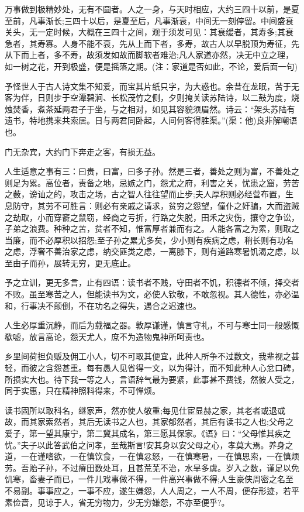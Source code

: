 \documentclass[letterpaper,10pt,english]{sphinxmanual}
\begin{document}
万事做到极精妙处，无有不圆者。人之一身，与天时相应，大约三四十以前，是夏至前，凡事渐长;三四十以后，是夏至后，凡事渐衰，中间无一刻停留。中间盛衰关头，无一定时候，大概在三四十之间，观于须发可见：其衰缓者，其寿多;其衰急者，其寿寡。人身不能不衰，先从上而下者，多寿，故古人以早脱顶为寿征，先从下而上者，多不寿，故须发如故而脚软者难治;凡人家道亦然，决无中立之理，如一树之花，开到极盛，便是摇落之期。(注：家道是否如此，不论，爱后面一句)

予怪世人于古人诗文集不知爱，而宝其片纸只字，为大惑也。余昔在龙眠，苦于无客为伴，日则步于空潭碧涧、长松茂竹之侧，夕则掩关读苏陆诗，以二鼓为度，烧烛焚香，煮茶延两君子于坐，与之相对，如见其容貌须眉然。诗云：“架头苏陆有遗书，特地携来共索居。日与两君同卧起，人间何客得胜渠。”(渠：他)良非解嘲语也。

门无杂宾，大约门下奔走之客，有损无益。

人生适意之事有三：曰贵，曰富，曰多子孙。然是三者，善处之则为富，不善处之则足为累。高位者，责备之地，忌嫉之门，怨尤之府，利害之关，忧患之窟，劳苦之薮，谤讪之的，攻击之场，古之智人往往望而止步;夫人厚积则必经营布置，生息防守，其劳不可胜言：则必有亲戚之请求，贫穷之怨望，僮仆之奸骗，大而盗贼之劫取，小而穿窬之鼠窃，经商之亏折，行路之失脱，田禾之灾伤，攘夺之争讼，子弟之浪费。种种之苦，贫者不知，惟富厚者兼而有之。人能各富之为累，则取之当廉，而不必厚积以招怨;至子孙之累尤多矣，少小则有疾病之虑，稍长则有功名之虑，浮奢不善治家之虑，纳交匪类之虑，一离膝下，则有道路寒暑饥渴之虑，以至由子而孙，展转无穷，更无底止。

予之立训，更无多言，止有四语：读书者不贱，守田者不饥，积德者不倾，择交者不败。虽至寒苦之人，但能读书为文，必使人钦敬，不敢忽视。其人德性，亦必温和，行事决不颠倒，不在功名之得失，遇合之迟速也。

人生必厚重沉静，而后为载福之器。敦厚谦谨，慎言守礼，不可与寒士同一般感慨欷嘘，放言高论，怨天尤人，庶不为造物鬼神所呵责也。

乡里间荷担负贩及佣工小人，切不可取其便宜，此种人所争不过数文，我辈视之甚轻，而彼之含怨甚重。每有愚人见省得一文，以为得计，而不知此种人心忿口碑，所损实大也。待下我一等之人，言语辞气最为要紧，此事甚不费钱，然彼人受之，同于实惠，只在精神照料得来，不可惮烦。

读书固所以取科名，继家声，然亦使人敬重;每见仕宦显赫之家，其老者或退或故，而其家索然者，其后无读书之人也，其家郁然者，其后有读书之人也;父母之爱子，第一望其康宁，第二冀其成名，第三愿其保家。《语》曰：“父母惟其疾之忧。”夫子以此答武伯之问孝，至哉斯言!安其身以安父母之心，孝莫大焉。养身之道，一在谨嗜欲，一在慎饮食，一在慎忿怒，一在慎寒暑，一在慎思索，一在慎烦劳。吾贻子孙，不过瘠田数处耳，且甚荒芜不治，水旱多虞。岁入之数，谨足以免饥寒，畜妻子而已，一件儿戏事做不得，一件高兴事做不得;人生豪侠周密之名至不易副。事事应之，一事不应，遂生嫌怨，人人周之，一人不周，便存形迹，若平素俭啬，见谅于人，省无穷物力，少无穷嫌怨，不亦至便乎?。
\end{document}
